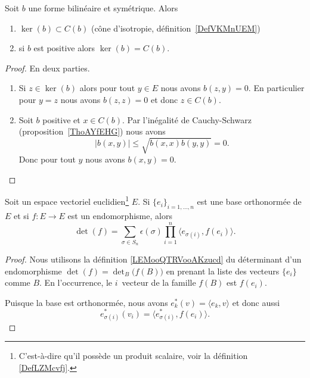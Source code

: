\begin{proposition}     \label{PropHIWjdMX}
	Soit \( b\) une forme bilinéaire et symétrique. Alors
	\begin{enumerate}
		\item
		      \( \ker(b)\subset C(b)\) (cône d'isotropie, définition~\ref{DefVKMnUEM})
		\item
		      si \( b\) est positive alors \( \ker(b)=C(b)\).
	\end{enumerate}
\end{proposition}

\begin{proof}
	En deux parties.
	\begin{enumerate}
		\item
		      Si \( z\in\ker(b)\) alors pour tout \( y\in E\) nous avons \( b(z,y)=0\). En particulier pour \( y=z\) nous avons \( b(z,z)=0\) et donc \( z\in C(b)\).
		\item
		      Soit \( b\) positive et \( x\in C(b)\). Par l'inégalité de Cauchy-Schwarz (proposition~\ref{ThoAYfEHG}) nous avons
		      \begin{equation}
			      | b(x,y) |\leq \sqrt{   b(x,x)b(y,y) }=0.
		      \end{equation}
		      Donc pour tout \( y\) nous avons \( b(x,y)=0\).
	\end{enumerate}
\end{proof}


\begin{lemma}       \label{LEMooEZFIooXyYybe}
	Soit un espace vectoriel euclidien\footnote{C'est-à-dire qu'il possède un produit scalaire, voir la définition \ref{DefLZMcvfj}.} \( E\). Si \( \{ e_i \}_{i=1,\ldots, n}\) est une base orthonormée de \( E\) et si \( f\colon E\to E\) est un endomorphisme, alors
	\begin{equation}        \label{EQooQAZLooZutFUz}
		\det(f)=\sum_{\sigma\in S_n}\epsilon(\sigma)\prod_{i=1}^n\langle e_{\sigma(i)}, f(e_i)\rangle.
	\end{equation}
\end{lemma}

\begin{proof}
	Nous utilisons la définition \ref{LEMooQTRVooAKzucd} du déterminant d'un endomorphisme \( \det(f)=\det_B\big( f(B) \big)\) en prenant la liste des vecteurs \( \{ e_i \}\) comme \( B\). En l'occurrence, le \( i\)\ieme\ vecteur de la famille \( f(B)\) est \( f(e_i)\).

	Puisque la base est orthonormée, nous avons \( e^*_k(v)=\langle e_k, v\rangle \) et donc aussi
	\begin{equation}
		e^*_{\sigma(i)}(v_i)=\langle e_{\sigma(i)}^*, f(e_i)\rangle.
	\end{equation}
\end{proof}

